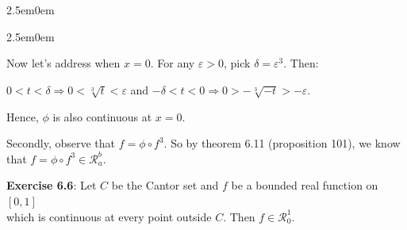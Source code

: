 \documentclass{book}
\newenvironment{myIndent}{%
   \begin{adjustwidth}{2.5em}{0em}%
}{%
   \end{adjustwidth}%
}
\newcommand{\retTwo}{\hfill\bigbreak}
\begin{document}
{\begin{myIndent}
\begin{myIndent}
      Now let's address when $x = 0$. For any $\varepsilon > 0$, pick $\delta = \varepsilon^3$. Then:
      
      {\centering $0 < t < \delta \Longrightarrow 0 < \sqrt[3]{t} < \varepsilon$ and $-\delta < t < 0 \Longrightarrow 0 > -\sqrt[3]{-t} > -\varepsilon$.\retTwo\par}

      Hence, $\phi$ is also continuous at $x = 0$.\retTwo
   \end{myIndent}

   Secondly, observe that $f = \phi \circ f^3$. So by theorem 6.11   (proposition 101), we know\\ that $f = \phi \circ f^3 \in \mathscr{R}_a^b$.
\end{myIndent}}

\newpage

\textbf{Exercise 6.6}: Let $C$ be the Cantor set and $f$ be a bounded real function on $[0, 1]$\\ which is continuous at every point outside $C$. Then $f \in \mathscr{R}_0^1$.\\ [-11pt]
\end{document}
